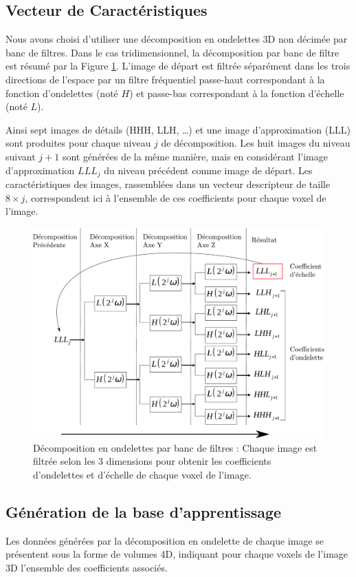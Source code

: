 \subsection{Vecteur de Caractéristiques}

Nous avons choisi d’utiliser une décomposition en ondelettes 3D non décimée par banc de filtres. Dans le cas tridimensionnel, la décomposition par banc de filtre est résumé par la Figure \ref{fig:ondelettes}. L’image de départ est filtrée séparément dans les trois directions de l’espace par un filtre fréquentiel passe-haut correspondant à la fonction d’ondelettes (noté $H$) et passe-bas correspondant à la fonction d’échelle (noté $L$). 

Ainsi sept images de détails (HHH, LLH, \dots) et une image d’approximation (LLL) sont produites pour chaque niveau $j$ de décomposition. Les huit images du niveau suivant $j+1$ sont générées de la même manière, mais en considérant l’image d’approximation $LLL_j$ du niveau précédent comme image de départ. Les caractéristiques des images, rassemblées dans un vecteur descripteur de taille $8\times j$, correspondent ici à l’ensemble de ces coefficients pour chaque voxel  de l’image. 

\begin{figure}
 \label{fig:ondelettes}
 \includegraphics[width=15cm]{images/decompHotell}
 \caption{Décomposition en ondelettes par banc de filtres : Chaque image est filtrée selon les 3 dimensions pour obtenir les coefficients d'ondelettes et d'échelle de chaque voxel de l'image.}
\end{figure}


\subsection{Génération de la base d'apprentissage}
Les données générées par la décomposition en ondelette de chaque image se présentent sous la forme de volumes 4D, indiquant pour chaque voxels de l'image 3D l'ensemble des coefficients associés.

